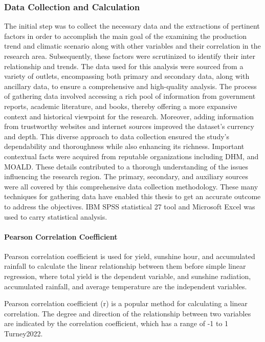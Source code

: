 \subsubsection{Data Collection and Calculation}
The initial step was to collect the necessary data and the extractions of pertinent factors in order to accomplish the main goal of the examining the production trend and climatic scenario along with other variables and their correlation in the research area. Subsequently, these factors were scrutinized to identify their inter relationship and trends. The data used for this analysis were sourced from a variety of outlets, encompassing both primary and secondary data, along with ancillary data, to ensure a comprehensive and high-quality analysis. The process of gathering data involved accessing a rich pool of information from government reports, academic literature, and books, thereby offering a more expansive context and historical viewpoint for the research.
Moreover, adding information from trustworthy websites and internet sources improved the dataset's currency and depth. This diverse approach to data collection ensured the study's dependability and thoroughness while also enhancing its richness. Important contextual facts were acquired from reputable organizations including DHM, and MOALD. These details contributed to a thorough understanding of the issues influencing the research region. The primary, secondary, and auxiliary sources were all covered by this comprehensive data collection methodology. These many techniques for gathering data have enabled this thesis to get an accurate outcome to address the objectives.
IBM SPSS statistical 27 tool and Microsoft Excel was used to carry statistical analysis. 

\paragraph{Pearson Correlation Coefficient}
Pearson correlation coefficient is used for yield, sunshine hour, and accumulated rainfall to calculate the linear relationship between them before simple linear regression, where total yield is the dependent variable, and sunshine radiation, accumulated rainfall, and average temperature are the independent variables.

Pearson correlation coefficient (r) is a popular method for calculating a linear correlation. The degree and direction of the relationship between two variables are indicated by the correlation coefficient, which has a range of -1 to 1 Turney2022. 

